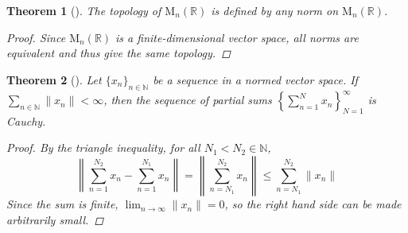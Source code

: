 \documentclass[letterpaper, 10pt]{article}
\theoremstyle{theostyle}
\newtheorem{theorem}{Theorem}[section]
\newenvironment{thmstyle}[1][]{%
    \begin{theorem}[#1]\leavevmode\vspace{-\baselineskip}\myquote%
    }{\endmyquote\end{theorem}}
\begin{document}
\begin{thmstyle}
    The topology of \(\mathrm{M}_n (\mathbb{R})\) is defined by any norm on \(\mathrm{M}_n (\mathbb{R})\).

    \begin{proof}
        Since \(\mathrm{M}_n (\mathbb{R})\) is a finite-dimensional vector space, all norms are equivalent and thus give the same topology.
    \end{proof}
\end{thmstyle}

\begin{thmstyle}
    Let \(\{x_n\}_{n \in \mathbb{N}}\) be a sequence in a normed vector space.
    If \(\displaystyle \sum_{n \in \mathbb{N}} \lVert x_n \rVert < \infty\), then the sequence of partial sums \( \displaystyle \left\{\sum_{n=1}^N x_n \right\}_{N=1}^\infty\) is Cauchy.

    \begin{proof}
        By the triangle inequality, for all \(N_1 < N_2 \in \mathbb{N}\),
        \[\left\lVert \sum_{n=1}^{N_2} x_n - \sum_{n=1}^{N_1} x_n \right\rVert = \left\lVert \sum_{n=N_1}^{N_2} x_n \right\rVert \leq \sum_{n=N_1}^{N_2} \lVert x_n \rVert \]
        Since the sum is finite, \(\displaystyle \lim_{n \to \infty} \lVert x_n \rVert = 0\), so the right hand side can be made arbitrarily small.
    \end{proof}
\end{thmstyle}
\end{document}
